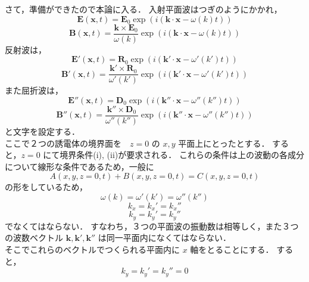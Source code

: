 \documentclass{jsarticle}
\numberwithin{equation}{section}
\theoremstyle{definition}
\begin{document}
さて，準備ができたので本論に入る．
入射平面波はつぎのようにかかれ，
\begin{equation}
    \label{nyusya1}
    \bm{E} (\bm{x}, t) = \bm{E}_0 \exp( i (\bm{k} \cdot \bm{x} - \omega (k) t) )
\end{equation}
\begin{equation}
    \label{nyusya2}
    \bm{B} (\bm{x}, t) = \frac{\bm{k} \times \bm{E}_0}{\omega (k)} \exp( i (\bm{k} \cdot \bm{x} - \omega (k) t) )
\end{equation}
反射波は，
\begin{equation}
    \bm{E'} (\bm{x}, t) = \bm{R}_0 \exp( i (\bm{k'} \cdot \bm{x} - \omega' (k') t) )
\end{equation}
\begin{equation}
    \bm{B'} (\bm{x}, t) = \frac{\bm{k'} \times \bm{R}_0}{\omega' (k')} \exp( i (\bm{k'} \cdot \bm{x} - \omega' (k') t) )
\end{equation}
また屈折波は，
\begin{equation}
    \bm{E''} (\bm{x}, t) = \bm{D}_0 \exp( i (\bm{k''} \cdot \bm{x} - \omega'' (k'') t) )
\end{equation}
\begin{equation}
    \bm{B''} (\bm{x}, t) = \frac{\bm{k''} \times \bm{D}_0}{\omega'' (k'')} \exp( i (\bm{k''} \cdot \bm{x} - \omega'' (k'') t) )
\end{equation}
と文字を設定する．\\
\quad ここで２つの誘電体の境界面を　$z = 0$ の $x,y$ 平面上にとったとする．
すると，$z = 0$ にて境界条件(i), (ii)が要求される．
これらの条件は上の波動の各成分について線形な条件であるため，一般に
\begin{equation}
    A(x, y, z = 0, t) + B(x, y, z = 0, t) = C(x, y, z = 0, t)
\end{equation}
の形をしているため，
\begin{equation}
    \omega (k) = \omega' (k') = \omega'' (k'')
\end{equation}
\begin{equation}
    k_x = k_x' = k_x''
\end{equation}
\begin{equation}
    k_y = k_y' = k_y''    
\end{equation}
でなくてはならない．
すなわち，３つの平面波の振動数は相等しく，また３つの波数ベクトル $\bm{k}, \bm{k'}, \bm{k''}$ は同一平面内になくてはならない．\\
\quad そこでこれらのベクトルでつくられる平面内に $x$ 軸をとることにする．
すると，
\begin{equation}
    k_y = k_y' = k_y'' = 0
\end{equation}
\end{document}
